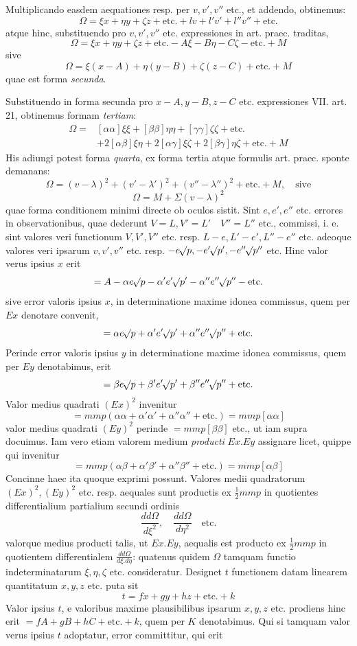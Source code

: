 Multiplicando easdem aequationes resp. per \(v,v',v''\) etc., et addendo, obtinemus:
\[
\Omega=\xi x+\eta y+\zeta z+\text{etc.}+lv+l'v'+l''v''+\text{etc.}
\]
atque hinc, substituendo pro \(v,v',v''\) etc. expressiones in art. praec. traditas,
\[
\Omega=\xi x+\eta y+\zeta z+\text{etc.}-A\xi-B\eta-C\zeta-\text{etc.}+M
\]
sive
\[
\Omega=\xi(x-A)+\eta(y-B)+\zeta(z-C)+\text{etc.}+M
\]
quae est forma \textit{secunda}.

Substituendo in forma secunda pro \(x-A,y-B,z-C\) etc. expressiones VII. art. 21, obtinemus formam \textit{tertiam}:
\[
\begin{aligned}
\Omega={}&[\alpha\alpha]\xi\xi+[\beta\beta]\eta\eta+[\gamma\gamma]\zeta\zeta+\text{etc.}\\
&+2[\alpha\beta]\xi\eta+2[\alpha\gamma]\xi\zeta+2[\beta\gamma]\eta\zeta+\text{etc.}+M
\end{aligned}
\]
His adiungi potest forma \textit{quarta}, ex forma tertia atque formulis art. praec. sponte demanans:
\[
\Omega=(v-\lambda)^2+(v'-\lambda')^2+(v''-\lambda'')^2+\text{etc.}+M,\quad\text{sive}
\]
\[
\Omega=M+\Sigma(v-\lambda)^2
\]
quae forma conditionem minimi directe ob oculos sistit.
Sint \(e,e',e''\) etc. errores in observationibus, quae dederunt \(V=L,\allowbreak V'=L'\quad V''=L''\) etc., commissi, i. e. sint valores veri functionum \(V,V',V''\) etc. resp. \(L-e,L'-e',L''-e''\) etc. adeoque valores veri ipsarum \(v,v',v''\) etc. resp. \(-e\mathord{{}^{}\!\surd}p,\allowbreak-e'\mathord{{}^{}\!\surd}p',\allowbreak-e''\mathord{{}^{}\!\surd}p''\) etc. Hinc valor verus ipsius \(x\) erit
\[
=A-\alpha e\mathord{{}^{}\!\surd}p-\alpha'e'\mathord{{}^{}\!\surd}p'-\alpha''e''\mathord{{}^{}\!\surd}p''-\text{etc.}
\]
sive error valoris ipsius \(x\), in determinatione maxime idonea commissus, quem per \(Ex\) denotare convenit,
\[
=\alpha e\mathord{{}^{}\!\surd}p+\alpha'e'\mathord{{}^{}\!\surd}p'+\alpha''e''\mathord{{}^{}\!\surd}p''+\text{etc.}
\]
Perinde error valoris ipsius \(y\) in determinatione maxime idonea commissus, quem per \(Ey\) denotabimus, erit
\[
=\beta e\mathord{{}^{}\!\surd}p+\beta'e'\mathord{{}^{}\!\surd}p'+\beta''e''\mathord{{}^{}\!\surd}p''+\text{etc.}
\]
Valor medius quadrati \((Ex)^2\) invenitur
\[
=mmp(\alpha\alpha+\alpha'\alpha'+\alpha''\alpha''+\text{etc.})=mmp[\alpha\alpha]
\]
valor medius quadrati \((Ey)^2\) perinde \(=mmp[\beta\beta]\) etc., ut iam supra docuimus. Iam vero etiam valorem medium \textit{producti} \(Ex.Ey\) assignare licet, quippe qui invenitur
\[
=mmp(\alpha\beta+\alpha'\beta'+\alpha''\beta''+\text{etc.})=mmp[\alpha\beta]
\]
Concinne haec ita quoque exprimi possunt. Valores medii quadratorum \((Ex)^2,(Ey)^2\) etc. resp. aequales sunt productis ex \(\frac12mmp\) in quotientes differentialium partialium secundi ordinis
\[
\frac{dd\Omega}{d\xi^2},\quad\frac{dd\Omega}{d\eta^2}\quad\text{etc.}
\]
valorque medius producti talis, ut \(Ex.Ey\), aequalis est producto ex \(\frac12mmp\) in quotientem differentialem \(\frac{dd\Omega}{d\xi.d\eta}\): quatenus quidem \(\Omega\) tamquam functio indeterminatarum \(\xi,\eta,\zeta\) etc. consideratur.
Designet \(t\) functionem datam linearem quantitatum \(x,y,z\) etc. puta sit
\[
t=fx+gy+hz+\text{etc.}+k
\]
Valor ipsius \(t\), e valoribus maxime plausibilibus ipsarum \(x,y,z\) etc. prodiens hinc erit \(=fA+gB+hC+\text{etc.}+k\), quem per \(K\) denotabimus. Qui si tamquam valor verus ipsius \(t\) adoptatur, error committitur, qui erit
